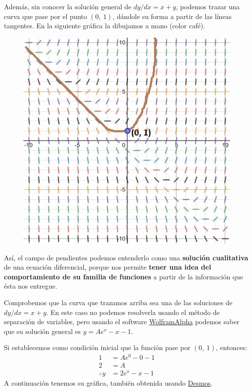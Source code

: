 \documentclass[12pt]{article}
\begin{document}
Además, sin conocer la solución general de $dy/dx = x + y$, podemos trazar una curva que pase por el punto $(0, \ 1)$, dándole su forma a partir de las líneas tangentes. En la siguiente gráfica la dibujamos a mano (color café).

\begin{figure}[hbt!]
\centering
\includegraphics[scale=0.5]{img/slope-field-2.jpg}
\end{figure}

Así, el campo de pendientes podemos entenderlo como una \textbf{solución cualitativa} de una ecuación diferencial, porque nos permite \textbf{tener una idea del comportamiento de su familia de funciones} a partir de la información que ésta nos entregue.

Comprobemos que la curva que trazamos arriba sea una de las soluciones de $dy/dx = x + y$. En este caso no podemos resolverla usando el método de separación de variables, pero usando el software \href{https://www.wolframalpha.com/input/?i=y\%27+\%3D+y+\%2B+x}{WolframAlpha} podemos saber que su solución general es $y = Ae^{x} - x - 1$.

Si establecemos como condición inicial que la función pase por $(0, \ 1)$, entonces:
\begin{align*}
  1 &= Ae^{0} - 0 - 1 \\
  2 &= A \\
  \therefore y &= 2e^{x} - x - 1
\end{align*}
A continuación tenemos su gráfica, también obtenida usando \href{https://www.desmos.com/calculator/byrqbn2so5}{Desmos}.
\end{document}

